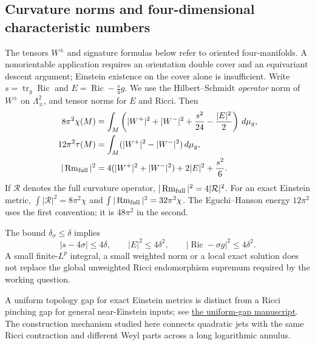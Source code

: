 \documentclass[a4paper,11pt]{article}
\numberwithin{equation}{section}
\theoremstyle{definition}
\newcommand{\Ric}{\operatorname{Ric}}
\newcommand{\Rm}{\operatorname{Rm}}
\newcommand{\tr}{\operatorname{tr}}
\newcommand{\dd}{\,d\mu_g}
\begin{document}
\subsection{Curvature norms and four-dimensional characteristic numbers}
The tensors $W^\pm$ and signature formulas below refer to oriented four-manifolds. A nonorientable application requires an orientation double cover and an equivariant descent argument; Einstein existence on the cover alone is insufficient. Write $s=\tr_g\Ric$ and $E=\Ric-\frac{s}{4}g$. We use the Hilbert--Schmidt \emph{operator} norm of $W^\pm$ on $\Lambda^2_\pm$, and tensor norms for $E$ and Ricci. Then
\begin{align}
8\pi^2\chi(M)&=\int_M\left(|W^+|^2+|W^-|^2+\frac{s^2}{24}-\frac{|E|^2}{2}\right)\dd,\label{eq:CGB}\\
12\pi^2\tau(M)&=\int_M(|W^+|^2-|W^-|^2)\dd,\label{eq:signature}\\
|\Rm_{\rm full}|^2&=4(|W^+|^2+|W^-|^2)+2|E|^2+\frac{s^2}{6}.
\end{align}
If $\mathcal R$ denotes the full curvature operator, $|\Rm_{\rm full}|^2=4|\mathcal R|^2$. For an exact Einstein metric, $\int|\mathcal R|^2=8\pi^2\chi$ and $\int|\Rm_{\rm full}|^2=32\pi^2\chi$. The Eguchi--Hanson energy $12\pi^2$ uses the first convention; it is $48\pi^2$ in the second.

The bound $\delta_\sigma\le\delta$ implies
\begin{equation}
 |s-4\sigma|\le4\delta,\qquad |E|^2\le4\delta^2,\qquad
 |\Ric-\sigma g|^2\le4\delta^2.
\end{equation}
A small finite-$L^p$ integral, a small weighted norm or a local exact solution does not replace the global unweighted Ricci endomorphism supremum required by the working question.

A uniform topology gap for exact Einstein metrics is distinct from a Ricci pinching gap for general near-Einstein inputs; see \href{20260916_uniform_gap.tex}{the uniform-gap manuscript}. The construction mechanism studied here connects quadratic jets with the same Ricci contraction and different Weyl parts across a long logarithmic annulus.
\end{document}
